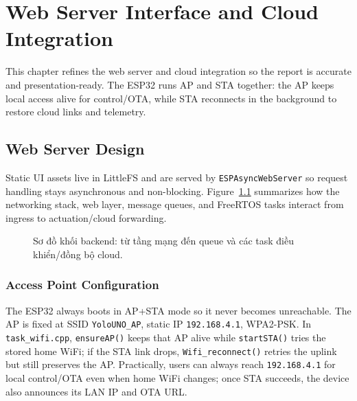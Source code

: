 \chapter{Web Server Interface and Cloud Integration}

This chapter refines the web server and cloud integration so the report is accurate and presentation-ready. The ESP32 runs AP and STA together: the AP keeps local access alive for control/OTA, while STA reconnects in the background to restore cloud links and telemetry.

\section{Web Server Design}

Static UI assets live in LittleFS and are served by \texttt{ESPAsyncWebServer} so request handling stays asynchronous and non-blocking. Figure~\ref{fig:backend_block} summarizes how the networking stack, web layer, message queues, and FreeRTOS tasks interact from ingress to actuation/cloud forwarding.

\begin{figure}[H]
    \centering
    \caption{Sơ đồ khối backend: từ tầng mạng đến queue và các task điều khiển/đồng bộ cloud.}
    \label{fig:backend_block}
\end{figure}

\subsection{Access Point Configuration}

The ESP32 always boots in AP+STA mode so it never becomes unreachable. The AP is fixed at SSID \texttt{YoloUNO\_AP}, static IP \texttt{192.168.4.1}, WPA2-PSK. In \texttt{task\_wifi.cpp}, \texttt{ensureAP()} keeps that AP alive while \texttt{startSTA()} tries the stored home WiFi; if the STA link drops, \texttt{Wifi\_reconnect()} retries the uplink but still preserves the AP. Practically, users can always reach \texttt{192.168.4.1} for local control/OTA even when home WiFi changes; once STA succeeds, the device also announces its LAN IP and OTA URL.

